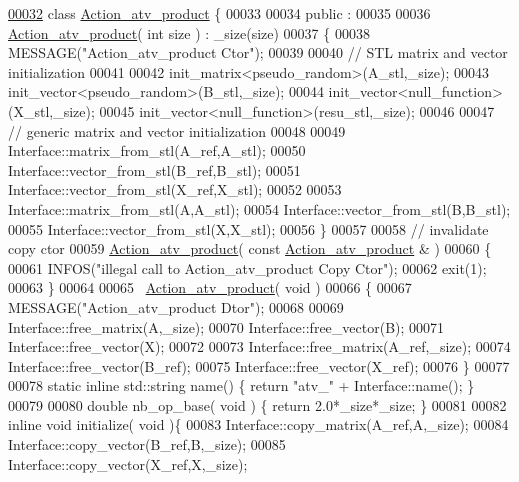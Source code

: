 \begin{DoxyCode}
\hyperlink{class_action__atv__product}{00032} \textcolor{keyword}{class }\hyperlink{class_action__atv__product}{Action\_atv\_product} \{
00033 
00034 public :
00035 
00036   \hyperlink{class_action__atv__product}{Action\_atv\_product}( \textcolor{keywordtype}{int} size ) : \_size(size)
00037   \{
00038     MESSAGE(\textcolor{stringliteral}{"Action\_atv\_product Ctor"});
00039 
00040     \textcolor{comment}{// STL matrix and vector initialization}
00041 
00042     init\_matrix<pseudo\_random>(A\_stl,\_size);
00043     init\_vector<pseudo\_random>(B\_stl,\_size);
00044     init\_vector<null\_function>(X\_stl,\_size);
00045     init\_vector<null\_function>(resu\_stl,\_size);
00046 
00047     \textcolor{comment}{// generic matrix and vector initialization}
00048 
00049     Interface::matrix\_from\_stl(A\_ref,A\_stl);
00050     Interface::vector\_from\_stl(B\_ref,B\_stl);
00051     Interface::vector\_from\_stl(X\_ref,X\_stl);
00052 
00053     Interface::matrix\_from\_stl(A,A\_stl);
00054     Interface::vector\_from\_stl(B,B\_stl);
00055     Interface::vector\_from\_stl(X,X\_stl);
00056   \}
00057 
00058   \textcolor{comment}{// invalidate copy ctor}
00059   \hyperlink{class_action__atv__product}{Action\_atv\_product}( \textcolor{keyword}{const}  \hyperlink{class_action__atv__product}{Action\_atv\_product} & )
00060   \{
00061     INFOS(\textcolor{stringliteral}{"illegal call to Action\_atv\_product Copy Ctor"});
00062     exit(1);
00063   \}
00064 
00065   ~\hyperlink{class_action__atv__product}{Action\_atv\_product}( \textcolor{keywordtype}{void} )
00066   \{
00067     MESSAGE(\textcolor{stringliteral}{"Action\_atv\_product Dtor"});
00068 
00069     Interface::free\_matrix(A,\_size);
00070     Interface::free\_vector(B);
00071     Interface::free\_vector(X);
00072 
00073     Interface::free\_matrix(A\_ref,\_size);
00074     Interface::free\_vector(B\_ref);
00075     Interface::free\_vector(X\_ref);
00076   \}
00077 
00078   \textcolor{keyword}{static} \textcolor{keyword}{inline} std::string name() \{ \textcolor{keywordflow}{return} \textcolor{stringliteral}{"atv\_"} + Interface::name(); \}
00079 
00080   \textcolor{keywordtype}{double} nb\_op\_base( \textcolor{keywordtype}{void} ) \{ \textcolor{keywordflow}{return} 2.0*\_size*\_size; \}
00081 
00082   \textcolor{keyword}{inline} \textcolor{keywordtype}{void} initialize( \textcolor{keywordtype}{void} )\{
00083     Interface::copy\_matrix(A\_ref,A,\_size);
00084     Interface::copy\_vector(B\_ref,B,\_size);
00085     Interface::copy\_vector(X\_ref,X,\_size);

\end{DoxyCode}
